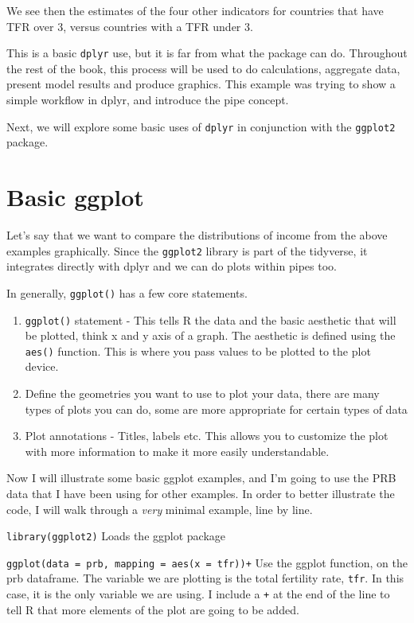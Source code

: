 \documentclass[
]{book}
\providecommand{\tightlist}{%
  \setlength{\itemsep}{0pt}\setlength{\parskip}{0pt}}
\begin{document}
We see then the estimates of the four other indicators for countries
that have TFR over 3, versus countries with a TFR under 3.

This is a basic \texttt{dplyr} use, but it is far from what the package can do.
Throughout the rest of the book, this process will be used to do
calculations, aggregate data, present model results and produce
graphics. This example was trying to show a simple workflow in dplyr,
and introduce the pipe concept.

Next, we will explore some basic uses of \texttt{dplyr} in conjunction with the
\texttt{ggplot2} package.

\hypertarget{basic-ggplot}{%
\section{Basic ggplot}\label{basic-ggplot}}

Let's say that we want to compare the distributions of income from the
above examples graphically. Since the \texttt{ggplot2} library is part of the
tidyverse, it integrates directly with dplyr and we can do plots within
pipes too.

In generally, \texttt{ggplot()} has a few core statements.

\begin{enumerate}
\def\labelenumi{\arabic{enumi})}
\tightlist
\item
  \texttt{ggplot()} statement - This tells R the data and the basic aesthetic
  that will be plotted, think x and y axis of a graph. The aesthetic
  is defined using the \texttt{aes()} function. This is where you pass values
  to be plotted to the plot device.
\item
  Define the geometries you want to use to plot your data, there are
  many types of plots you can do, some are more appropriate for
  certain types of data
\item
  Plot annotations - Titles, labels etc. This allows you to customize
  the plot with more information to make it more easily
  understandable.
\end{enumerate}

Now I will illustrate some basic ggplot examples, and I'm going to use
the PRB data that I have been using for other examples. In order to
better illustrate the code, I will walk through a \emph{very} minimal
example, line by line.

\texttt{library(ggplot2)} Loads the ggplot package

\texttt{ggplot(data\ =\ prb,\ mapping\ =\ aes(x\ =\ tfr))+} Use the ggplot function,
on the prb dataframe. The variable we are plotting is the total
fertility rate, \texttt{tfr}. In this case, it is the only variable we are
using. I include a \texttt{+} at the end of the line to tell R that more
elements of the plot are going to be added.
\end{document}
